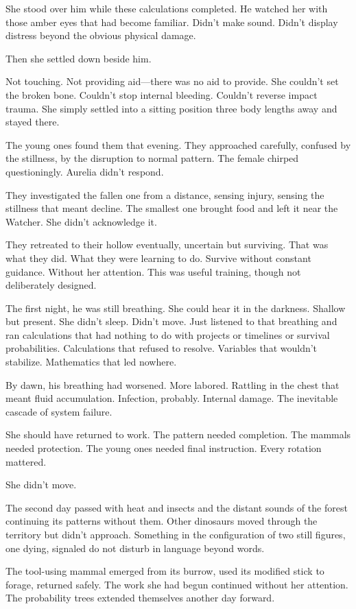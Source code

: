 She stood over him while these calculations completed. He watched her with those amber eyes that had become familiar. Didn't make sound. Didn't display distress beyond the obvious physical damage.

Then she settled down beside him.

Not touching. Not providing aid—there was no aid to provide. She couldn't set the broken bone. Couldn't stop internal bleeding. Couldn't reverse impact trauma. She simply settled into a sitting position three body lengths away and stayed there.

The young ones found them that evening. They approached carefully, confused by the stillness, by the disruption to normal pattern. The female chirped questioningly. Aurelia didn't respond.

They investigated the fallen one from a distance, sensing injury, sensing the stillness that meant decline. The smallest one brought food and left it near the Watcher. She didn't acknowledge it.

They retreated to their hollow eventually, uncertain but surviving. That was what they did. What they were learning to do. Survive without constant guidance. Without her attention. This was useful training, though not deliberately designed.

The first night, he was still breathing. She could hear it in the darkness. Shallow but present. She didn't sleep. Didn't move. Just listened to that breathing and ran calculations that had nothing to do with projects or timelines or survival probabilities. Calculations that refused to resolve. Variables that wouldn't stabilize. Mathematics that led nowhere.

By dawn, his breathing had worsened. More labored. Rattling in the chest that meant fluid accumulation. Infection, probably. Internal damage. The inevitable cascade of system failure.

She should have returned to work. The pattern needed completion. The mammals needed protection. The young ones needed final instruction. Every rotation mattered.

She didn't move.

The second day passed with heat and insects and the distant sounds of the forest continuing its patterns without them. Other dinosaurs moved through the territory but didn't approach. Something in the configuration of two still figures, one dying, signaled do not disturb in language beyond words.

The tool-using mammal emerged from its burrow, used its modified stick to forage, returned safely. The work she had begun continued without her attention. The probability trees extended themselves another day forward.

